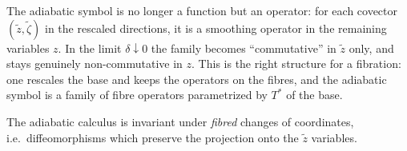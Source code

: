 \begin{discussion}
The adiabatic symbol is no longer a function but an operator: for each
covector $(\tilde z,\tilde\zeta)$ in the rescaled directions, it is a smoothing
operator in the remaining variables $z$. In the limit $\delta\downarrow0$ the
family becomes ``commutative'' in $\tilde z$ only, and stays genuinely
non-commutative in $z$. This is the right structure for a fibration: one
rescales the base and keeps the operators on the fibres, and the adiabatic
symbol is a family of fibre operators parametrized by $T^*$ of the base.
\end{discussion}

The adiabatic calculus is invariant under \emph{fibred} changes of coordinates,
i.e.\ diffeomorphisms which preserve the projection onto the $\tilde z$ variables.

